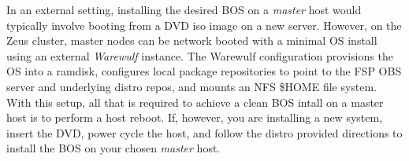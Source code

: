 In an external setting, installing the desired BOS on a {\em master} host would
typically involve booting from a DVD iso image on a new server.  However, on
the Zeus cluster, master nodes can be network booted with a minimal OS install
using an external {\em Warewulf} instance. The Warewulf configuration
provisions the OS into a ramdisk, configures local package repositories to
point to the FSP OBS server and underlying distro repos, and mounts an
NFS \$HOME file system. With this setup, all that is required to achieve a
clean BOS intall on a master host is to perform a host reboot. If, however, you
are installing a new system, insert the \baseOS{} DVD, power cycle the host,
and follow the distro provided directions to install the BOS on your chosen
{\em master} host.  
